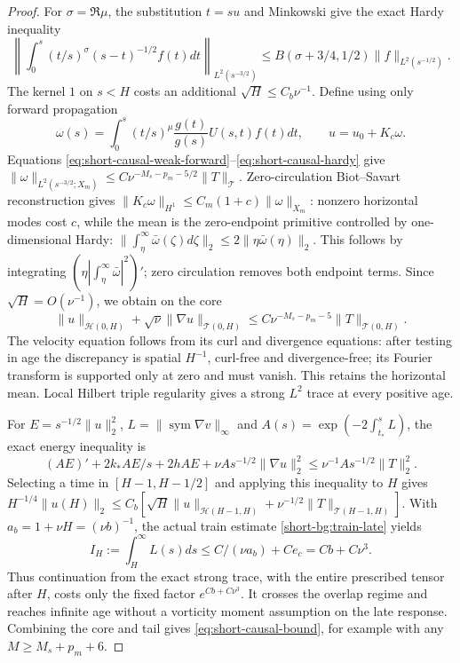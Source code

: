 \begin{proof}
For $\sigma=\Re\mu$, the substitution $t=su$ and Minkowski give
the exact Hardy inequality
\begin{equation}\label{eq:short-causal-hardy}
 \left\|\int_0^s(t/s)^\sigma(s-t)^{-1/2}f(t)dt\right\|_{L^2(s^{-3/2})}
 \le B(\sigma+3/4,1/2)\|f\|_{L^2(s^{-1/2})}.
\end{equation}
The kernel $1$ on $s<H$ costs an additional $\sqrt H\le C_b\nu^{-1}$.
Define using only forward propagation
\[
 \omega(s)=\int_0^s(t/s)^\mu\frac{g(t)}{g(s)}U(s,t)f(t)dt,
 \qquad u=u_0+K_c\omega.
\]
Equations \eqref{eq:short-causal-weak-forward}--\eqref{eq:short-causal-hardy}
give $\|\omega\|_{L^2(s^{-3/2};X_m)}
\le C\nu^{-M_s-p_m-5/2}\|T\|_{\mathcal T}$.
Zero-circulation Biot--Savart reconstruction gives
$\|K_c\omega\|_{H^1}\le C_m(1+c)\|\omega\|_{X_m}$:
nonzero horizontal modes cost $c$, while the mean is the
zero-endpoint primitive controlled by one-dimensional Hardy:
$\|\int_\eta^\infty\bar\omega(\zeta)d\zeta\|_2
\le2\|\eta\bar\omega(\eta)\|_2$. This follows by integrating
$(\eta|\int_\eta^\infty\bar\omega|^2)'$; zero circulation
removes both endpoint terms.
Since $\sqrt H=O(\nu^{-1})$, we obtain on the core
\[
 \|u\|_{\mathcal H(0,H)}
 +\sqrt\nu\|\nabla u\|_{\mathcal T(0,H)}
 \le C\nu^{-M_s-p_m-5}\|T\|_{\mathcal T(0,H)}.
\]
The velocity equation follows from its curl and divergence equations:
after testing in age the discrepancy is spatial $H^{-1}$, curl-free
and divergence-free; its Fourier transform is supported only at zero
and must vanish. This retains the horizontal mean. Local Hilbert
triple regularity gives a strong $L^2$ trace at every positive age.

For $E=s^{-1/2}\|u\|_2^2$, $L=\|\operatorname{sym}\nabla v\|_\infty$
and $A(s)=\exp(-2\int_{t_*}^sL)$, the exact energy inequality is
\begin{equation}\label{eq:short-causal-tail-energy}
 (AE)'+2k_*AE/s+2hAE+\nu A s^{-1/2}\|\nabla u\|_2^2
 \le\nu^{-1}A s^{-1/2}\|T\|_2^2.
\end{equation}
Selecting a time in $[H-1,H-1/2]$ and applying this inequality to $H$
gives
$H^{-1/4}\|u(H)\|_2
\le C_b[\sqrt H\|u\|_{\mathcal H(H-1,H)}
+\nu^{-1/2}\|T\|_{\mathcal T(H-1,H)}]$.
With $a_b=1+\nu H=(\nu b)^{-1}$, the actual train estimate
\eqref{short-bg:train-late} yields
\[
 I_H:=\int_H^\infty L(s)ds
 \le C/(\nu a_b)+Ce_c=Cb+C\nu^3.
\]
Thus continuation from the exact strong trace, with the entire
prescribed tensor after $H$, costs only the fixed factor $e^{Cb+C\nu^3}$.
It crosses the overlap regime and reaches infinite age without a
vorticity moment assumption on the late response. Combining the
core and tail gives \eqref{eq:short-causal-bound}, for example with
any $M\ge M_s+p_m+6$.


\end{proof}

